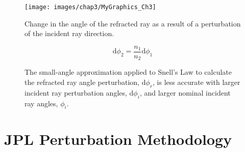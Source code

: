 \begin{figure}[htb]		%
\centering
\texttt{[image: images/chap3/MyGraphics\_Ch3]}
\caption{Change in the angle of the refracted ray as a result of a perturbation of the incident ray direction.}
\label{fig:anglePerturbation}
\end{figure}

\begin{equation}			%
\textrm{d}\phi_2 = \frac{n_1}{n_2}\textrm{d}\phi_1
\label{eq:taylorSnell}
\end{equation}

\begin{figure}[h]			%
\begin{center}
\caption{The small-angle approximation applied to Snell's Law to calculate the refracted ray angle perturbation, $\textrm{d}\phi_r$, is less accurate with larger incident ray perturbation angles, $\textrm{d}\phi_i$, and larger nominal incident ray angles, $\phi_i$.}
\label{fig:smallAngleApprox}
\end{center}
\end{figure}

\section{JPL Perturbation Methodology}
\label{sec:pertJPL}

